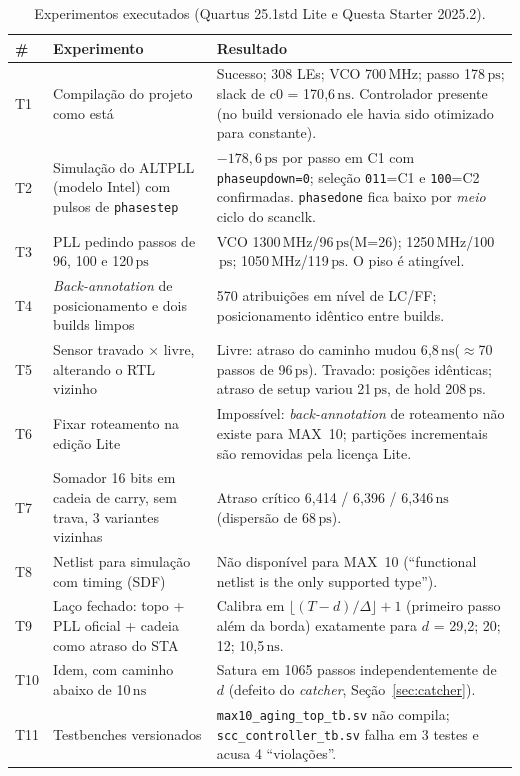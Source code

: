 \documentclass[11pt,a4paper]{article}
\newcommand{\ps}{\ensuremath{\,\mathrm{ps}}\xspace}
\newcommand{\ns}{\ensuremath{\,\mathrm{ns}}\xspace}
\newcommand{\MHz}{\ensuremath{\,\mathrm{MHz}}\xspace}
\newcommand{\file}[1]{\texttt{\small #1}}
\begin{document}
\begin{table}[H]
\centering
\caption{Experimentos executados (Quartus 25.1std Lite e Questa Starter 2025.2).}
\label{tab:testes}
\small
\begin{tabularx}{\textwidth}{@{}C{0.6cm} L{4.2cm} Y@{}}
\toprule
\textbf{\#} & \textbf{Experimento} & \textbf{Resultado} \\
\midrule
T1 & Compilação do projeto como está & Sucesso; 308 LEs; VCO 700\MHz; passo 178\ps; slack de c0 = 170{,}6\ns. Controlador presente (no build versionado ele havia sido otimizado para constante). \\
T2 & Simulação do ALTPLL (modelo Intel) com pulsos de \texttt{phasestep} & $-178{,}6\ps$ por passo em C1 com \texttt{phaseupdown=0}; seleção \texttt{011}=C1 e \texttt{100}=C2 confirmadas. \texttt{phasedone} fica baixo por \emph{meio} ciclo do scanclk. \\
T3 & PLL pedindo passos de 96, 100 e 120\ps & VCO 1300\MHz/96\ps (M=26); 1250\MHz/100\ps; 1050\MHz/119\ps. O piso é atingível. \\
T4 & \emph{Back-annotation} de posicionamento e dois builds limpos & 570 atribuições em nível de LC/FF; posicionamento idêntico entre builds. \\
T5 & Sensor travado $\times$ livre, alterando o RTL vizinho & Livre: atraso do caminho mudou 6{,}8\ns ($\approx$70 passos de 96\ps). Travado: posições idênticas; atraso de setup variou 21\ps, de hold 208\ps. \\
T6 & Fixar roteamento na edição Lite & Impossível: \emph{back-annotation} de roteamento não existe para MAX~10; partições incrementais são removidas pela licença Lite. \\
T7 & Somador 16 bits em cadeia de carry, sem trava, 3 variantes vizinhas & Atraso crítico 6{,}414 / 6{,}396 / 6{,}346\ns (dispersão de 68\ps). \\
T8 & Netlist para simulação com timing (SDF) & Não disponível para MAX~10 (``functional netlist is the only supported type''). \\
T9 & Laço fechado: topo + PLL oficial + cadeia como atraso do STA & Calibra em $\lfloor (T-d)/\Delta \rfloor + 1$ (primeiro passo além da borda) exatamente para $d$ = 29{,}2; 20; 12; 10{,}5\ns. \\
T10 & Idem, com caminho abaixo de 10\ns & Satura em 1065 passos independentemente de $d$ (defeito do \emph{catcher}, Seção~\ref{sec:catcher}). \\
T11 & Testbenches versionados & \file{max10\_aging\_top\_tb.sv} não compila; \file{scc\_controller\_tb.sv} falha em 3 testes e acusa 4 ``violações''. \\
\bottomrule
\end{tabularx}
\end{table}
\end{document}

